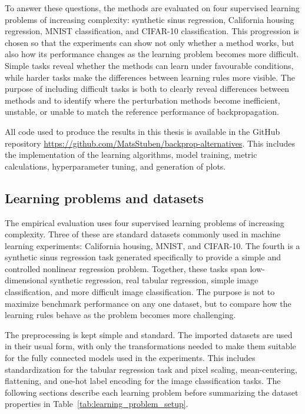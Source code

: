 To answer these questions, the methods are evaluated on four supervised learning problems of increasing complexity: synthetic sinus regression, California housing regression, MNIST classification, and CIFAR-10 classification. This progression is chosen so that the experiments can show not only whether a method works, but also how its performance changes as the learning problem becomes more difficult. Simple tasks reveal whether the methods can learn under favourable conditions, while harder tasks make the differences between learning rules more visible. The purpose of including difficult tasks is both to clearly reveal differences between methods and to identify where the perturbation methods become inefficient, unstable, or unable to match the reference performance of backpropagation.

All code used to produce the results in this thesis is available in the GitHub repository \url{https://github.com/MatsStuben/backprop-alternatives}. This includes the implementation of the learning algorithms, model training, metric calculations, hyperparameter tuning, and generation of plots.

\subsection{Learning problems and datasets}

The empirical evaluation uses four supervised learning problems of increasing complexity. Three of these are standard datasets commonly used in machine learning experiments: California housing, MNIST, and CIFAR-10. The fourth is a synthetic sinus regression task generated specifically to provide a simple and controlled nonlinear regression problem. Together, these tasks span low-dimensional synthetic regression, real tabular regression, simple image classification, and more difficult image classification. The purpose is not to maximize benchmark performance on any one dataset, but to compare how the learning rules behave as the problem becomes more challenging.

The preprocessing is kept simple and standard. The imported datasets are used in their usual form, with only the transformations needed to make them suitable for the fully connected models used in the experiments. This includes standardization for the tabular regression task and pixel scaling, mean-centering, flattening, and one-hot label encoding for the image classification tasks. The following sections describe each learning problem before summarizing the dataset properties in Table~\ref{tab:learning_problem_setup}.


